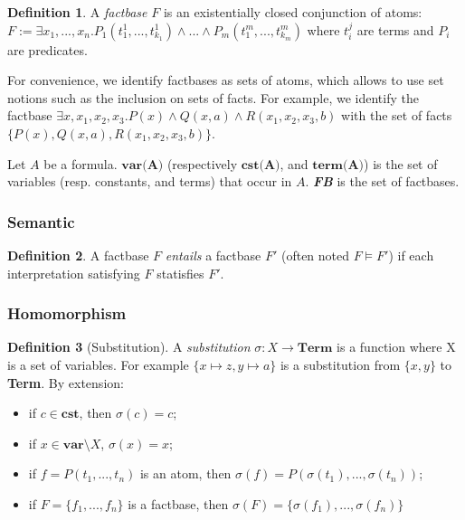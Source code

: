 \documentclass{article}
\theoremstyle{definition}
\newtheorem{definition}{Definition}[section]
\theoremstyle{remark}
\begin{document}
\begin{definition}
A \emph{factbase} $F$ is an existentially closed conjunction of atoms: $F := \exists x_{1},...,x_{n}.P_{1}(t_{1}^{1},...,t_{k_{1}}^{1})\land ...\land P_{m}(t_{1}^{m},...,t_{k_{m}}^{m})$ where $t_i^j$ are terms and $P_i$ are predicates.
\end{definition}
For convenience, we identify factbases as sets of atoms, which allows to  use  set  notions  such  as  the  inclusion  on  sets  of  facts. For example, we identify the factbase $\exists x,x_{1},x_{2},x_{3}. P(x) \land Q(x,a) \land R(x_{1},x_{2},x_{3},b)$ with the set of facts $\{P(x),Q(x,a),R(x_{1},x_{2},x_{3},b)\}$.

Let $A$ be a formula. \emph{$\textbf{var(A)}$} (respectively \emph{$\textbf{cst(A)}$}, and \emph{$\textbf{term(A)}$}) is the set of variables (resp. constants, and terms) that occur in $A$.  \emph{\textbf{FB}} is the set of factbases.

\subsubsection{Semantic}

\begin{definition}
A factbase $F$ \emph{entails} a factbase $F'$ (often noted $F \models F'$) if each interpretation satisfying $F$ statisfies $F'$.
\end{definition}	

\subsubsection{Homomorphism}

\begin{definition}[Substitution]
A \emph{substitution} $\sigma:X \to \textbf{Term}$ is a function where X is a set of variables. For example $\{x \mapsto z, y \mapsto a \}$ is a substitution from $\{x,y\}$ to \textbf{Term}. By extension: 
\begin{itemize}
\item if $c \in \textbf{cst}$, then $\sigma(c) = c$;
\item if $x \in \textbf{var} \setminus X$, $\sigma(x) = x$;
\item if $f = P(t_1,...,t_n)$ is an atom, then $\sigma(f) = P(\sigma(t_1),...,\sigma(t_n))$;
\item if $F = \{f_1,...,f_n\}$ is a factbase, then $\sigma(F) = \{\sigma(f_1),...,\sigma(f_n)\}$
\end{itemize}
\end{definition}
\end{document}
